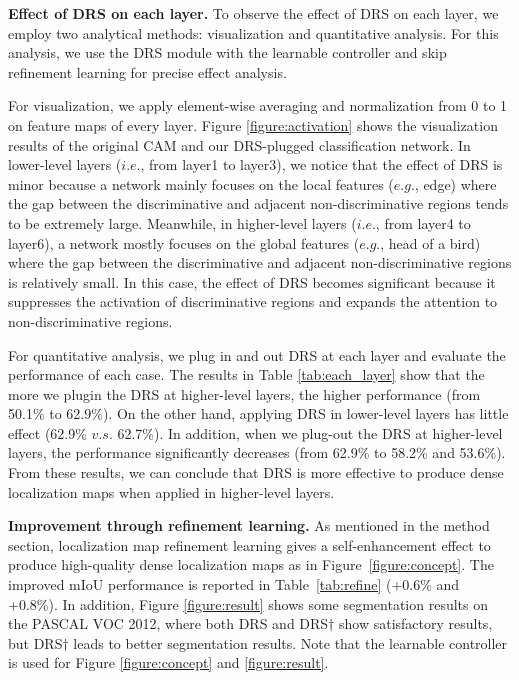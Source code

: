 \documentclass[letterpaper]{article} \usepackage{aaai21}  \usepackage{times}  \usepackage{helvet} \usepackage{courier}  \usepackage[hyphens]{url}  \usepackage{graphicx} \urlstyle{rm} \def\UrlFont{\rm}  \usepackage{natbib}  \usepackage{caption} \frenchspacing  \setlength{\pdfpagewidth}{8.5in}  \setlength{\pdfpageheight}{11in}
\begin{document}
\noindent\textbf{Effect of DRS on each layer.}
To observe the effect of DRS on each layer, we employ two analytical methods: visualization and quantitative analysis.
For this analysis, we use the DRS module with the learnable controller and skip refinement learning for precise effect analysis. 

For visualization, we apply element-wise averaging and normalization from 0 to 1 on feature maps of every layer. Figure \ref{figure:activation} shows the visualization results of the original CAM and our DRS-plugged classification network.
In lower-level layers ($i.e.$, from layer1 to layer3), we notice that the effect of DRS is minor because a network mainly focuses on the local features ($e.g.$, edge) where the gap between the discriminative and adjacent non-discriminative regions tends to be extremely large.
Meanwhile, in higher-level layers ($i.e.$, from layer4 to layer6), a network mostly focuses on the global features ($e.g.$, head of a bird) where the gap between the discriminative and adjacent non-discriminative regions is relatively small.
In this case, the effect of DRS becomes significant because it suppresses the activation of discriminative regions and expands the attention to non-discriminative regions.

For quantitative analysis, we plug in and out DRS at each layer and evaluate the performance of each case.
The results in Table \ref{tab:each_layer} show that the more we plugin the DRS at higher-level layers, the higher performance (from 50.1\% to 62.9\%).
On the other hand, applying DRS in lower-level layers has little effect (62.9\% $v.s.$ 62.7\%).
In addition, when we plug-out the DRS at higher-level layers, the performance significantly decreases (from 62.9\% to 58.2\% and 53.6\%).
From these results, we can conclude that DRS is more effective to produce dense localization maps when applied in higher-level layers.

\noindent\textbf{Improvement through refinement learning.}
As mentioned in the method section, localization map refinement learning gives a self-enhancement effect to produce high-quality dense localization maps as in Figure~\ref{figure:concept}. 
The improved mIoU performance is reported in Table~\ref{tab:refine} (+0.6\% and +0.8\%).
In addition, Figure \ref{figure:result} shows some segmentation results on the PASCAL VOC 2012, where both DRS and DRS$\dagger$ show satisfactory results, but DRS$\dagger$ leads to better segmentation results. 
Note that the learnable controller is used for Figure \ref{figure:concept} and \ref{figure:result}.
\end{document}
